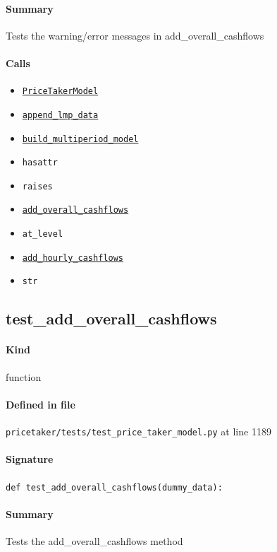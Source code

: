 \documentclass[11pt]{report}
\begin{document}
\paragraph{Summary} Tests the warning/error messages in add\_overall\_cashflows
\paragraph{Calls}
\begin{itemize}[leftmargin=*]
  \item \hyperref[def:pricetaker-price_taker_model.py:PriceTakerModel:L161]{\texttt{PriceTakerModel}}
  \item \hyperref[def:pricetaker-price_taker_model.py:PriceTakerModel.append_lmp_data:L221]{\texttt{append\_lmp\_data}}
  \item \hyperref[def:pricetaker-price_taker_model.py:PriceTakerModel.build_multiperiod_model:L291]{\texttt{build\_multiperiod\_model}}
  \item \texttt{hasattr}
  \item \texttt{raises}
  \item \hyperref[def:pricetaker-price_taker_model.py:PriceTakerModel.add_overall_cashflows:L997]{\texttt{add\_overall\_cashflows}}
  \item \texttt{at\_level}
  \item \hyperref[def:pricetaker-price_taker_model.py:PriceTakerModel.add_hourly_cashflows:L897]{\texttt{add\_hourly\_cashflows}}
  \item \texttt{str}
\end{itemize}
\subsection{test\_add\_overall\_cashflows}
\label{def:pricetaker-tests-test_price_taker_model.py:test_add_overall_cashflows:L1189}
\paragraph{Kind} function
\paragraph{Defined in file} \texttt{pricetaker/tests/test\_price\_taker\_model.py} at line 1189
\paragraph{Signature} \texttt{def test\_add\_overall\_cashflows(dummy\_data):}
\paragraph{Summary} Tests the add\_overall\_cashflows method
\end{document}

